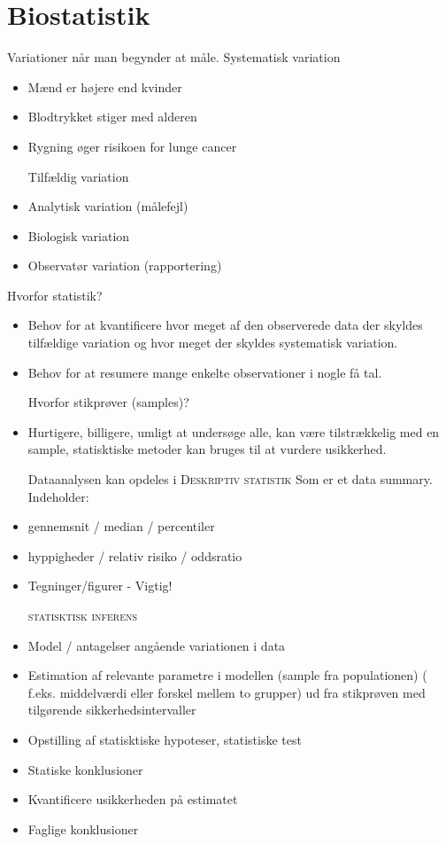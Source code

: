 \documentclass[12pt, letterpaper]{article}
\begin{document}
\section*{Biostatistik}

Variationer når man begynder at måle.
Systematisk variation
\begin{itemize}
\item Mænd er højere end kvinder
\item Blodtrykket stiger med alderen
\item Rygning øger risikoen for lunge cancer \newline


Tilfældig variation

\item Analytisk variation (målefejl)
\item Biologisk variation
\item Observatør variation (rapportering)
\end{itemize}

Hvorfor statistik?
\begin{itemize}
\item Behov for at kvantificere hvor meget af den observerede data der skyldes tilfældige variation og hvor meget der skyldes systematisk variation. \newline
\item Behov for at resumere mange enkelte observationer i nogle få tal. \newline

Hvorfor stikprøver (samples)?
\item Hurtigere, billigere, umligt at undersøge alle, kan være tilstrækkelig med en sample, statisktiske metoder kan bruges til at vurdere usikkerhed. \newline

Dataanalysen kan opdeles i \newline
\textsc {Deskriptiv statistik}
Som er et data summary. Indeholder:
\item gennemsnit / median / percentiler
\item hyppigheder / relativ risiko / oddsratio
\item Tegninger/figurer - Vigtig! \newline

\textsc{statisktisk inferens}
\item Model / antagelser angående variationen i data
\item Estimation af relevante parametre i modellen (sample fra populationen) ( f.eks. middelværdi eller forskel mellem to grupper) ud fra stikprøven med tilgørende sikkerhedsintervaller
\item Opstilling af statisktiske hypoteser, statistiske test
\item Statiske konklusioner
\item Kvantificere usikkerheden på estimatet
\item Faglige konklusioner
\end{itemize}
\end{document}
